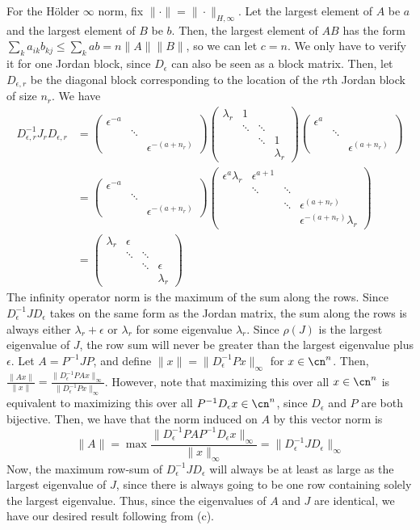 \documentclass{article}
\newcommand{\ep}{\epsilon}
\newcommand{\openm}{\begin{pmatrix}}
\newcommand{\closem}{\end{pmatrix}}
\begin{document}
For the H\"{o}lder $\infty$ norm, fix $\|\cdot\|=\|\cdot\|_{H,\infty}$. Let the largest element of $A$ be $a$ and the largest element of $B$ be $b$. Then, the largest element of $AB$ has the form $\sum_ka_{ik}b_{kj}\leq\sum_kab=n\|A\|\|B\|$, so we can let $c=n$.
We only have to verify it for one Jordan block, since $D_\ep$ can also be seen as a block matrix. Then, let $D_{\ep,r}$ be the diagonal block corresponding to the location of the $r$th Jordan block of size $n_r$. We have
\begin{align*}
    D_{\ep,r}^{-1}J_rD_{\ep,r}&=\openm\ep^{-a}&&\\&\ddots&\\&&\ep^{-(a+n_r)}\closem\openm\lambda_r&1&&\\&\ddots&\ddots&\\&&\ddots&1\\&&&\lambda_r\closem\openm\ep^{a}&&\\&\ddots&\\&&\ep^{(a+n_r)}\closem\\
                              &=\openm\ep^{-a}&&\\&\ddots&\\&&\ep^{-(a+n_r)}\closem\openm\ep^a\lambda_r&\ep^{a+1}&&\\&\ddots&\ddots&\\&&\ddots&\ep^{(a+n_r)}\\&&&\ep^{-(a+n_r)}\lambda_r\closem\\
                              &=\openm\lambda_r&\ep&&\\&\ddots&\ddots&\\&&\ddots&\ep\\&&&\lambda_r\closem
\end{align*}
The infinity operator norm is the maximum of the sum along the rows. Since $D_\ep^{-1}JD_\ep$ takes on the same form as the Jordan matrix, the sum along the rows is always either $\lambda_r+\ep$ or $\lambda_r$ for some eigenvalue $\lambda_r$. Since $\rho(J)$ is the largest eigenvalue of $J$, the row sum will never be greater than the largest eigenvalue plus $\ep$.
Let $A=P^{-1}JP$, and define $\|x\|=\|D_\ep^{-1}Px\|_\infty$ for $x\in\cn^n$. Then, $\frac{\|Ax\|}{\|x\|}=\frac{\|D_\ep^{-1}PAx\|_\infty}{\|D_\ep^{-1}Px\|_\infty}$. However, note that maximizing this over all $x\in\cn^n$ is equivalent to maximizing this over all $P^{-1}D_\ep x\in\cn^n$, since $D_\ep$ and $P$ are both bijective. Then, we have that the norm induced on $A$ by this vector norm is
\[\|A\|=\max\frac{\|D_\ep^{-1}PAP^{-1}D_\ep x\|_\infty}{\|x\|_\infty}=\|D_\ep^{-1}JD_\ep\|_\infty\]
Now, the maximum row-sum of $D_\ep^{-1}JD_\ep$ will always be at least as large as the largest eigenvalue of $J$, since there is always going to be one row containing solely the largest eigenvalue. Thus, since the eigenvalues of $A$ and $J$ are identical, we have our desired result following from (c).
\end{document}
